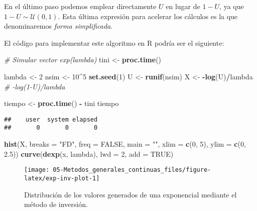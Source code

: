 \documentclass[
]{book}
\newenvironment{Shaded}{\begin{snugshade}}{\end{snugshade}}
\newcommand{\CommentTok}[1]{\textcolor[rgb]{0.56,0.35,0.01}{\textit{#1}}}
\newcommand{\DataTypeTok}[1]{\textcolor[rgb]{0.13,0.29,0.53}{#1}}
\newcommand{\DecValTok}[1]{\textcolor[rgb]{0.00,0.00,0.81}{#1}}
\newcommand{\FloatTok}[1]{\textcolor[rgb]{0.00,0.00,0.81}{#1}}
\newcommand{\KeywordTok}[1]{\textcolor[rgb]{0.13,0.29,0.53}{\textbf{#1}}}
\newcommand{\NormalTok}[1]{#1}
\newcommand{\OperatorTok}[1]{\textcolor[rgb]{0.81,0.36,0.00}{\textbf{#1}}}
\newcommand{\OtherTok}[1]{\textcolor[rgb]{0.56,0.35,0.01}{#1}}
\newcommand{\StringTok}[1]{\textcolor[rgb]{0.31,0.60,0.02}{#1}}
\theoremstyle{break}
\theoremstyle{definition}
\theoremstyle{definition}
\theoremstyle{definition}
\theoremstyle{remark}
\begin{document}
En el último paso podemos emplear directamente \(U\) en lugar de \(1-U\), ya que \(1 - U\sim \mathcal{U}\left( 0,1\right)\).
Esta última expresión para acelerar los cálculos es la que denominaremos \emph{forma simplificada}.

El código para implementar este algoritmo en R podría ser el siguiente:

\begin{Shaded}
\begin{Highlighting}[]
\CommentTok{# Simular vector exp(lambda)}
\NormalTok{tini <-}\StringTok{ }\KeywordTok{proc.time}\NormalTok{()}

\NormalTok{lambda <-}\StringTok{ }\DecValTok{2}
\NormalTok{nsim <-}\StringTok{ }\DecValTok{10}\OperatorTok{^}\DecValTok{5}
\KeywordTok{set.seed}\NormalTok{(}\DecValTok{1}\NormalTok{)}
\NormalTok{U <-}\StringTok{ }\KeywordTok{runif}\NormalTok{(nsim)}
\NormalTok{X <-}\StringTok{ }\OperatorTok{-}\KeywordTok{log}\NormalTok{(U)}\OperatorTok{/}\NormalTok{lambda }\CommentTok{# -log(1-U)/lambda}

\NormalTok{tiempo <-}\StringTok{ }\KeywordTok{proc.time}\NormalTok{() }\OperatorTok{-}\StringTok{ }\NormalTok{tini}
\NormalTok{tiempo}
\end{Highlighting}
\end{Shaded}

\begin{verbatim}
##    user  system elapsed 
##       0       0       0
\end{verbatim}

\begin{Shaded}
\begin{Highlighting}[]
\KeywordTok{hist}\NormalTok{(X, }\DataTypeTok{breaks =} \StringTok{"FD"}\NormalTok{, }\DataTypeTok{freq =} \OtherTok{FALSE}\NormalTok{, }
        \DataTypeTok{main =} \StringTok{""}\NormalTok{, }\DataTypeTok{xlim =} \KeywordTok{c}\NormalTok{(}\DecValTok{0}\NormalTok{, }\DecValTok{5}\NormalTok{), }\DataTypeTok{ylim =} \KeywordTok{c}\NormalTok{(}\DecValTok{0}\NormalTok{, }\FloatTok{2.5}\NormalTok{))}
\KeywordTok{curve}\NormalTok{(}\KeywordTok{dexp}\NormalTok{(x, lambda), }\DataTypeTok{lwd =} \DecValTok{2}\NormalTok{, }\DataTypeTok{add =} \OtherTok{TRUE}\NormalTok{)}
\end{Highlighting}
\end{Shaded}

\begin{figure}[!htb]

{\centering \texttt{[image: 05-Metodos\_generales\_continuas\_files/figure-latex/exp-inv-plot-1]} 

}

\caption{Distribución de los valores generados de una exponencial mediante el método de inversión.}\label{fig:exp-inv-plot}
\end{figure}
\end{document}
